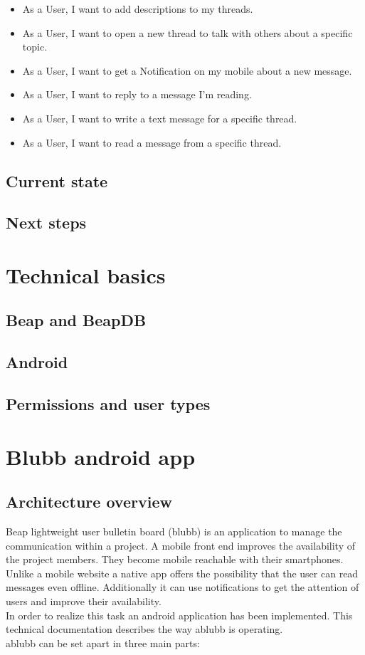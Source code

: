 \documentclass[12pt,a4paper,oneside]{report}
\newcommand{\appname}{ablubb}
\newcommand{\blubb}{blubb}
\begin{document}
\begin{itemize}
     \item As a User, I want to add descriptions to my threads.
     \item As a User, I want to open a new thread to talk with others about a specific topic.
     \item As a User, I want to get a Notification on my mobile about a new message.
     \item As a User, I want to reply to a message I'm reading.
     \item As a User, I want to write a text message for a specific thread.
     \item As a User, I want to read a message from a specific thread. 
   \end{itemize}
\section{Current state}

\section{Next steps}

\chapter{Technical basics}

\section{Beap and BeapDB}

\section{Android}

\section{Permissions and user types}

\chapter{Blubb android app}

\section{Architecture overview}
 Beap lightweight user bulletin board (\blubb{}) is an application to manage the communication within a project. A mobile front end improves the availability of the project members. They become mobile reachable with their smartphones. Unlike a mobile website a native app offers the possibility that the user can read messages even offline. Additionally it can use notifications to get the attention of users and improve their availability. \\
In order to realize this task an android application has been implemented. This technical documentation describes the way  \appname{} is operating.\\
\appname{} can be set apart in three main parts: 
\end{document}
